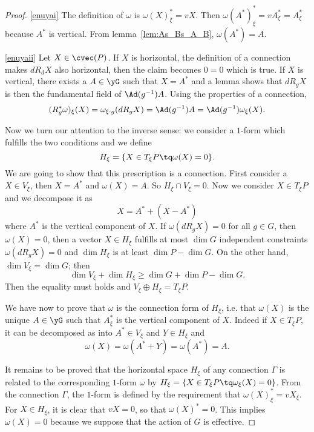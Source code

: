 \begin{proof}
\ref{enuyai} The definition of $\omega$ is $\omega(X)^*_{\xi}=vX$. Then $\omega(A^*)^*_{\xi}=vA^*_{\xi}=A^*_{\xi}$ because $A^*$ is vertical. From lemma~\ref{lem:As_Bs_A_B}, $\omega(A^*)=A$.

\ref{enuyaii} Let $X\in\cvec(P)$. If $X$ is horizontal, the definition of a connection makes $dR_d X$ also horizontal, then the claim becomes $0=0$ which is true. If $X$ is vertical, there exists a $A\in\yG$ such that $X=A^*$ and a lemma shows that $dR_gX$ is then the fundamental field of $\Ad(g^{-1})A$. Using the properties of a connection,
\begin{equation}
  (R^*_g\omega)_{\xi}(X)=\omega_{\xi\cdot g}(dR_g X)=\Ad(g^{-1})A=\Ad(g^{-1})\omega_{\xi}(X).
\end{equation}

Now we turn our attention to the inverse sense: we consider a $1$-form which fulfills the two conditions and we define
\begin{equation}
   H_{\xi}=\{X\in T_{\xi} P\tq \omega(X)=0\}.
\end{equation}
We are going to show that this prescription is a connection. First consider a $X\in V_{\xi}$, then $X=A^*$ and $\omega(X)=A$. So $H_{\xi}\cap V_{\xi}=0$. Now we consider $X\in T_{\xi} P$ and we decompose it as
\[
   X=A^*+(X-A^*)
\]
where $A^*$ is the vertical component of $X$. If $\omega(dR_g X)=0$ for all $g\in G$, then $\omega(X)=0$, then a vector $X\in H_{\xi}$ fulfills at most $\dim G$ independent constraints $\omega(dR_g X)=0$ and $\dim H_{\xi}$ is at least $\dim P-\dim G$. On the other hand, $\dim V_{\xi}=\dim G$; then
\[
  \dim V_{\xi}+\dim H_{\xi}\geq\dim G+\dim P-\dim G.
\]
Then the equality must holds and $V_{\xi}\oplus H_{\xi}=T_{\xi} P$.

We have now to prove that $\omega$ is the connection form of $H_{\xi}$, i.e. that $\omega(X)$ is the unique $A\in\yG$ such that $A^*_{\xi}$ is the vertical component of $X$. Indeed if $X\in T_{\xi} P$, it can be decomposed as into $A^*\in V_{\xi}$ and $Y\in H_{\xi}$ and
\[
   \omega(X)=\omega(A^*+Y)=\omega(A^*)=A.
\]

It remains to be proved that the horizontal space $H_{\xi}$ of any connection $\Gamma$ is related to the corresponding $1$-form $\omega$ by $H_{\xi}=\{X\in T_{\xi} P\tq\omega_{\xi}(X)=0\}$. From the connection $\Gamma$, the $1$-form is defined by the requirement that $\omega(X)^*_{\xi}=vX_{\xi}$. For $X\in H_{\xi}$, it is clear that $vX=0$, so that $\omega(X)^*=0$. This implies $\omega(X)=0$ because we suppose that the action of $G$ is effective.

\end{proof}

